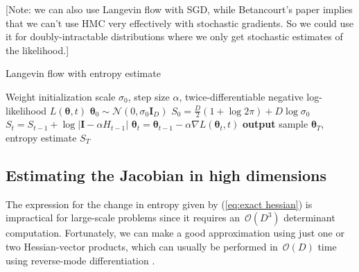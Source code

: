 \documentclass{article}
\newcommand{\vg}{\mathbf{g}}
\newcommand{\vr}{\mathbf{r}}
\newcommand{\vI}{\mathbf{I}}
\newcommand{\tra}{^{\mathsf{T}}}
\newcommand{\N}[2]{\mathcal{N}\!\left(#1,#2\right)}
\newcommand{\params}{\mathbf{\theta}}
\newcommand{\stepsize}{\alpha}
\newcommand{\gradparams}{\nabla L(\params_t, t)}
\newcommand{\entropy}{S}
\newcommand{\bigo}[1]{\mathcal{O}\left(#1\right)}
\begin{document}
[Note: we can also use Langevin flow with SGD, while Betancourt's paper implies that we can't use HMC very effectively with stochastic gradients.  So we could use it for doubly-intractable distributions where we only get stochastic estimates of the likelihood.]

\begin{algorithm}[t]
   \caption{Langevin flow with entropy estimate}
   \label{alg:langevin-with-estimate}
\begin{algorithmic}[1]
	Weight initialization scale $\sigma_0$, step size $\stepsize$,
	twice-differentiable negative log-likelihood $L(\params, t)$
	 $\params_0 \sim \N{0}{\sigma_0 \vI_D}$
	 $\entropy_{0} = \frac{D}{2} (1 + \log 2 \pi) + D \log\sigma_0$
		\State $\entropy_{t} = \entropy_{t-1} + \log \left| \vI - \stepsize H_{t-1} \right|$ \label{step:entropy-update}
		\State $\params_{t} = \params_{t-1} - \stepsize \gradparams$  	
   \EndFor
   \State \textbf{output} sample $\params_T$, entropy estimate $\entropy_T$
\end{algorithmic}
\end{algorithm}



\subsection{Estimating the Jacobian in high dimensions}
\label{sec:scalable-estimator}
The expression for the change in entropy given by (\ref{eq:exact hessian}) is impractical for large-scale problems since it requires an~$\bigo{D^3}$ determinant computation.
Fortunately, we can make a good approximation using just one or two Hessian-vector products, which can usually be performed in~$\bigo{D}$ time using reverse-mode differentiation \citep{pearlmutter1994fast}.
\end{document}
